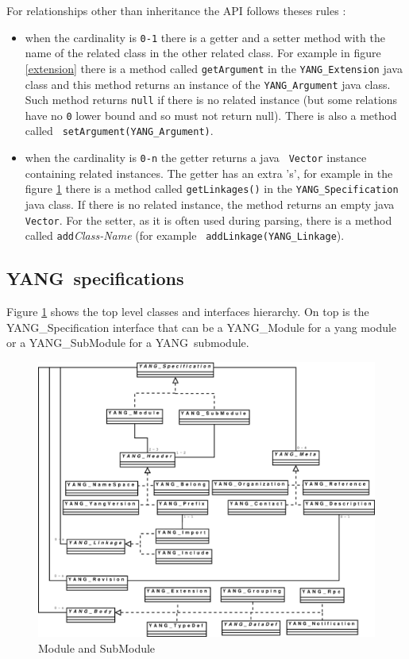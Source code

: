 \documentclass[a4paper]{article}
\newcommand{\y}{YANG}
\begin{document}
For relationships other than inheritance the API follows theses rules :
\begin{itemize}
\item
when  the cardinality  is {\tt  0-1} there  is a  getter and  a setter
method  with  the name  of  the related  class  in  the other  related
class. For example in figure  \ref{extension} there is a method called
{\tt  getArgument} in the  {\tt YANG\_Extension}  java class  and this
method  returns   an  instance   of  the  {\tt   YANG\_Argument}  java
class. Such method returns {\tt  null} if there is no related instance
(but some relations have no {\tt 0} lower bound and so must not return
null).      There     is     also     a     method     called     {\tt
setArgument(YANG\_Argument)}.
\item
when  the cardinality  is {\tt  0-n} the  getter returns  a  java {\tt
Vector} instance containing related instances. The getter has an extra
's', for  example in  the figure \ref{spec}  there is a  method called
{\tt getLinkages()}  in the  {\tt YANG\_Specification} java  class. If
there is  no related instance, the  method returns an  empty java {\tt
Vector}. For the setter, as it  is often used during parsing, there is
a  method   called  {\tt   add}{\sl  Class-Name}  (for   example  {\tt
addLinkage(YANG\_Linkage}).
\end{itemize}
 
\subsection{\y\ specifications}

Figure  \ref{spec}   shows  the  top  level   classes  and  interfaces
hierarchy.  On top is the  YANG\_Specification interface that can be a
YANG\_Module  for  a  yang  module  or a  YANG\_SubModule  for  a  \y\
submodule.

\begin{figure}[htbp]
\begin{center}
\includegraphics[scale = .3]{yspec.eps}
\end{center}
\caption{Module and SubModule}
\label{spec}
\end{figure}
\end{document}
